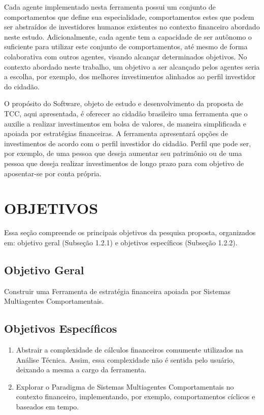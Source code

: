 Cada agente implementado nesta ferramenta possui um conjunto de comportamentos que define sua especialidade, comportamentos estes que podem ser abstraídos de investidores humanos existentes no contexto financeiro abordado neste estudo. Adicionalmente, cada agente tem a capacidade de ser autônomo o suficiente para utilizar este conjunto de comportamentos, até mesmo de forma colaborativa com outros agentes, visando alcançar determinados objetivos. No contexto abordado neste trabalho, um objetivo a ser alcançado pelos agentes seria a escolha, por exemplo, dos melhores investimentos alinhados ao perfil investidor do cidadão.

O propósito do Software, objeto de estudo e desenvolvimento da proposta de TCC, aqui apresentada, é oferecer ao cidadão brasileiro uma ferramenta que o auxilie a realizar investimentos em bolsa de valores, de maneira simplificada e apoiada por estratégias financeiras. A ferramenta apresentará opções de investimentos de acordo com o perfil investidor do cidadão. Perfil que pode ser, por exemplo, de uma pessoa que deseja aumentar seu patrimônio ou de uma pessoa que deseja realizar investimentos de longo prazo para com objetivo de aposentar-se por conta própria.

\section{OBJETIVOS}

Essa seção compreende os principais objetivos da pesquisa proposta, organizados em: objetivo geral (Subseção 1.2.1) e objetivos específicos (Subseção 1.2.2).


\subsection {Objetivo Geral}

Construir uma Ferramenta de estratégia financeira apoiada por Sistemas Multiagentes Comportamentais.

\subsection {Objetivos Específicos}

\begin{enumerate}
\item Abstrair a complexidade de cálculos financeiros comumente utilizados na Análise Técnica. Assim, essa complexidade não é sentida pelo usuário, deixando a mesma a cargo da ferramenta.
\item Explorar o Paradigma de Sistemas Multiagentes Comportamentais no contexto financeiro, implementando, por exemplo, comportamentos cíclicos e baseados em tempo.
\end{enumerate}


